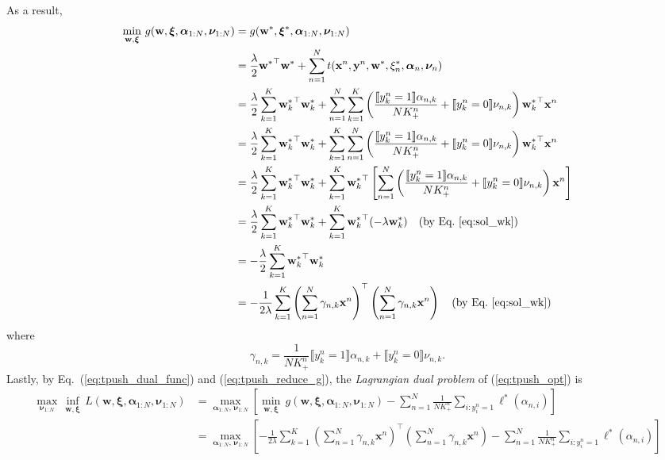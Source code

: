 \documentclass[9pt]{extarticle}
\newcommand{\llb}{\llbracket}
\newcommand{\rrb}{\rrbracket}
\newcommand{\x}{\mathbf{x}}
\newcommand{\y}{\mathbf{y}}
\newcommand{\1}{\mathbf{1}}
\newcommand{\w}{\mathbf{w}}
\newcommand{\alphabm}{\bm{\alpha}}
\newcommand{\nubm}{\bm{\nu}}
\newcommand{\xibm}{\bm{\xi}}
\begin{document}
%
As a result,
\begin{equation}
\label{eq:tpush_reduce_g}
\begin{aligned}
\min_{\w, \xibm} \, g(\w, \xibm, \alphabm_{1:N}, \nubm_{1:N}) 
&= g(\w^*, \xibm^*, \alphabm_{1:N}, \nubm_{1:N}) \\
&= \frac{\lambda}{2} {\w^*}^\top \w^* + \sum_{n=1}^N t(\x^n, \y^n, \w^*, \xi_n^*, \alphabm_n, \nubm_n) \\
&= \frac{\lambda}{2} \sum_{k=1}^K {\w_k^*}^\top \w_k^* + \sum_{n=1}^N \sum_{k=1}^K 
   \left( \frac{\llb y_k^n=1 \rrb \alpha_{n,k}}{N K_+^n} + \llb y_k^n=0 \rrb \nu_{n,k} \right) {\w_k^*}^\top \x^n \\
&= \frac{\lambda}{2} \sum_{k=1}^K {\w_k^*}^\top \w_k^* + \sum_{k=1}^K \sum_{n=1}^N 
   \left( \frac{\llb y_k^n=1 \rrb \alpha_{n,k}}{N K_+^n} + \llb y_k^n=0 \rrb \nu_{n,k} \right) {\w_k^*}^\top \x^n \\
&= \frac{\lambda}{2} \sum_{k=1}^K {\w_k^*}^\top \w_k^* + \sum_{k=1}^K {\w_k^*}^\top \left[ \sum_{n=1}^N 
   \left( \frac{\llb y_k^n=1 \rrb \alpha_{n,k}}{N K_+^n} + \llb y_k^n=0 \rrb \nu_{n,k} \right) \x^n \right] \\
&= \frac{\lambda}{2} \sum_{k=1}^K {\w_k^*}^\top \w_k^* + \sum_{k=1}^K {\w_k^*}^\top (-\lambda \w_k^*) \quad 
   \text{(by Eq.~\ref{eq:sol_wk})} \\
&= -\frac{\lambda}{2} \sum_{k=1}^K {\w_k^*}^\top \w_k^* \\
&= -\frac{1}{2 \lambda} \sum_{k=1}^K \left( \sum_{n=1}^N \gamma_{n,k} \x^n \right)^\top \left( \sum_{n=1}^N \gamma_{n,k} \x^n \right) \quad
   \text{(by Eq.~\ref{eq:sol_wk})}
\end{aligned}
\end{equation}
where
\begin{equation}
\label{eq:new_var}
\gamma_{n,k} = \frac{1}{N K_+^n} \llb y_k^n=1 \rrb \alpha_{n,k} + \llb y_k^n=0 \rrb \nu_{n,k}.
\end{equation}
%
Lastly, by Eq.~(\ref{eq:tpush_dual_func}) and (\ref{eq:tpush_reduce_g}), the \emph{Lagrangian dual problem} of (\ref{eq:tpush_opt}) is
\begin{align*}
\underset{\nubm_{1:N}}{\max} \, \inf_{\w, \xibm} \, L(\w, \xibm, \alphabm_{1:N}, \nubm_{1:N})
&= \underset{\alphabm_{1:N}, \, \nubm_{1:N}}{\max} \left[ \min_{\w, \xibm} \, g(\w, \xibm, \alphabm_{1:N}, \nubm_{1:N}) -
   \sum_{n=1}^N \frac{1}{N K_+^n} \sum_{i:y_i^n=1} \ell^*(\alpha_{n,i}) \right] \\
&= \underset{\alphabm_{1:N}, \, \nubm_{1:N}}{\max} \left[ 
   -\frac{1}{2 \lambda} \sum_{k=1}^K \left( \sum_{n=1}^N \gamma_{n,k} \x^n \right)^\top \left( \sum_{n=1}^N \gamma_{n,k} \x^n \right)
   -\sum_{n=1}^N \frac{1}{N K_+^n} \sum_{i:y_i^n=1} \ell^*(\alpha_{n,i}) \right]
\end{align*}
\end{document}
